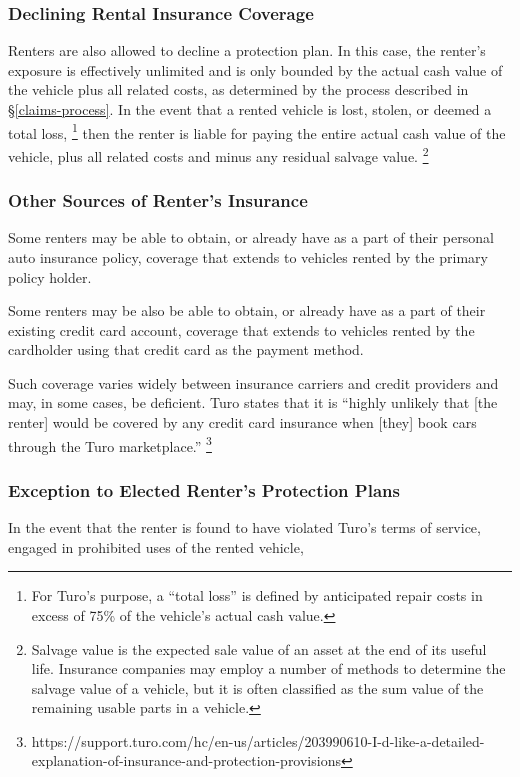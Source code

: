 \documentclass[preprint,12pt]{elsarticle}
\begin{document}
\subsubsection{Declining Rental Insurance Coverage}
Renters are also allowed to decline a protection plan. In this case, the renter's exposure is effectively unlimited and is only bounded by the actual cash value of the vehicle plus all related costs, as determined by the process described in \S\ref{claims-process}. In the event that a rented vehicle is lost, stolen, or deemed a total loss,
\footnote{For Turo's purpose, a ``total loss'' is defined by anticipated repair costs in excess of 75\% of the vehicle's actual cash value.
}
then the renter is liable for paying the entire actual cash value of the vehicle, plus all related costs and minus any residual salvage value.
\footnote{Salvage value is the expected sale value of an asset at the end of its useful life. Insurance companies may employ a number of methods to determine the salvage value of a vehicle, but it is often classified as the sum value of the remaining usable parts in a vehicle.
}

\subsubsection{Other Sources of Renter's Insurance}
Some renters may be able to obtain, or already have as a part of their personal auto insurance policy, coverage that extends to vehicles rented by the primary policy holder.

Some renters may be also be able to obtain, or already have as a part of their existing credit card account, coverage that extends to vehicles rented by the cardholder using that credit card as the payment method.

Such coverage varies widely between insurance carriers and credit providers and may, in some cases, be deficient. Turo states that it is ``highly unlikely that [the renter] would be covered by any credit card insurance when [they] book cars through the Turo marketplace.''
\footnote{https://support.turo.com/hc/en-us/articles/203990610-I-d-like-a-detailed-explanation-of-insurance-and-protection-provisions}

\subsubsection{Exception to Elected Renter's Protection Plans}
In the event that the renter is found to have violated Turo's terms of service, engaged in prohibited uses of the rented vehicle, 
\end{document}
